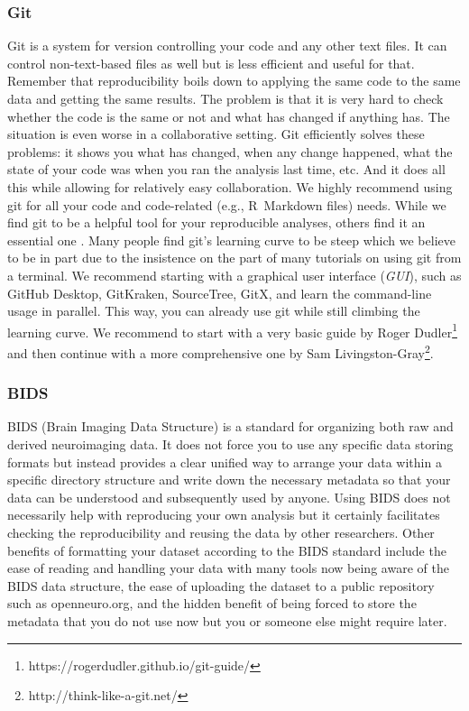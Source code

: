 \documentclass[a4paper,man,floatsintext,natbib]{apa6}
\begin{document}
\subsubsection{Git}
Git is a system for version controlling your code and any other text files. It can control non-text-based files as well but is less efficient and useful for that. Remember that reproducibility boils down to applying the same code to the same data and getting the same results. The problem is that it is very hard to check whether the code is the same or not and what has changed if anything has. The situation is even worse in a collaborative setting. Git efficiently solves these problems: it shows you what has changed, when any change happened, what the state of your code was when you ran the analysis last time, etc. And it does all this while allowing for relatively easy collaboration. We highly recommend using git for all your code and code-related (e.g., R~Markdown files) needs. While we find git to be a helpful tool for your reproducible analyses, others find it an essential one \citep{peikertReproducibleDataAnalysis2021a}. Many people find git's learning curve to be steep which we believe to be in part due to the insistence on the part of many tutorials on using git from a terminal. We recommend starting with a graphical user interface (\emph{GUI}), such as GitHub Desktop, GitKraken, SourceTree, GitX, and learn the command-line usage in parallel.
This way, you can already use git while still climbing the learning curve.
We recommend to start with a very basic guide by Roger Dudler\footnote{https://rogerdudler.github.io/git-guide/} and then continue with a more comprehensive one by Sam Livingston-Gray\footnote{http://think-like-a-git.net/}.

\subsubsection{BIDS}
BIDS (Brain Imaging Data Structure) is a standard for organizing both raw and derived neuroimaging data. It does not force you to use any specific data storing formats but instead provides a clear unified way to arrange your data within a specific directory structure and write down the necessary metadata so that your data can be understood and subsequently used by anyone. Using BIDS does not necessarily help with reproducing your own analysis but it certainly facilitates checking the reproducibility and reusing the data by other researchers. Other benefits of formatting your dataset according to the BIDS standard include the ease of reading and handling your data with many tools now being aware of the BIDS data structure, the ease of uploading the dataset to a public repository such as openneuro.org, and the hidden benefit of being forced to store the metadata that you do not use now but you or someone else might require later.
\end{document}
